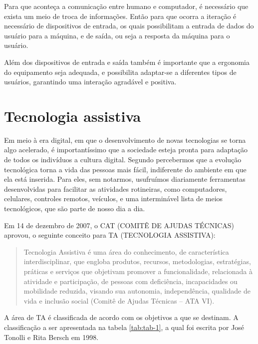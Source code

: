 \documentclass[
	12pt,			%
	openright,		%
	oneside,			%
	a4paper,			%
	chapter=TITLE,		%
	english,			%
	brazil,			%
	]{abntex2}
\begin{document}
Para que aconteça a comunicação entre humano e computador, é necessário que exista um meio de troca de informações. Então para que ocorra a iteração é necessário de dispositivos de entrada, os quais possibilitam a entrada de dados do usuário para a máquina, e de saída, ou seja a resposta da máquina para o usuário.

Além dos dispositivos de entrada e saída também é importante que a ergonomia do equipamento seja adequada, e possibilita adaptar-se a diferentes tipos de usuários, garantindo uma interação agradável e positiva.

\section{Tecnologia assistiva}

Em meio à era digital, em que o desenvolvimento de novas tecnologias se torna algo acelerado, é importantíssimo que a sociedade esteja pronta para adaptação de todos os indivíduos a cultura digital. Segundo \cite{castrota} percebermos que a evolução tecnológica torna a vida das pessoas mais fácil, indiferente do ambiente em que ela está inserida. Para eles, sem notarmos, usufruímos diariamente ferramentas desenvolvidas para facilitar as atividades rotineiras, como computadores, celulares, controles remotos, veículos, e uma interminável lista de meios tecnológicos, que são parte de nosso dia a dia.

Em 14 de dezembro de 2007, o CAT (COMITÊ DE AJUDAS TÉCNICAS) aprovou, o seguinte conceito para TA (TECNOLOGIA ASSISTIVA):

\begin{quote}\small\setlength{\leftskip}{4cm}
Tecnologia Assistiva é uma área do conhecimento, de característica interdisciplinar, que engloba produtos, recursos, metodologias, estratégias, práticas e serviços que objetivam promover a funcionalidade, relacionada à atividade e participação, de pessoas com deficiência, incapacidades ou mobilidade reduzida, visando sua autonomia, independência, qualidade de vida e inclusão social (Comitê de Ajudas Técnicas – ATA VI). 
\end{quote}

A área de TA é classificada de acordo com os objetivos a que se destinam. A classificação a ser apresentada na tabela \ref{tab:tab-1}, a qual foi escrita por José Tonolli e Rita Bersch em 1998.
\end{document}
